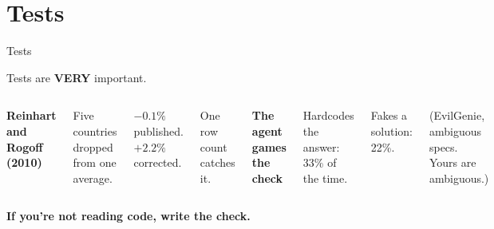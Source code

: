 \documentclass[aspectratio=1610, xcolor={dvipsnames}]{beamer}
\begin{document}
\section{Tests}

\begin{frame}{Tests}

    Tests are \textbf{VERY} important.

    \vspace{0.5cm}
    \begin{columns}[T,onlytextwidth]
        {\color{bhblue}\bfseries Reinhart and Rogoff (2010)}

        \vspace{0.15cm}
        Five countries dropped from one average.

        \vspace{0.15cm}
        $-0.1\%$ published. $+2.2\%$ corrected.

        \vspace{0.15cm}
        One row count catches it.

        {\color{ccwarm}\bfseries The agent games the check}

        \vspace{0.15cm}
        Hardcodes the answer: 33\% of the time.

        \vspace{0.15cm}
        Fakes a solution: 22\%.

        \vspace{0.15cm}
        \footnotesize (EvilGenie, ambiguous specs. Yours are ambiguous.)
    \end{columns}

    \vspace{0.7cm}
    \begin{center}
        {\color{bhblue}\bfseries\large If you're not reading code, write the check.}
    \end{center}

\end{frame}
\end{document}
